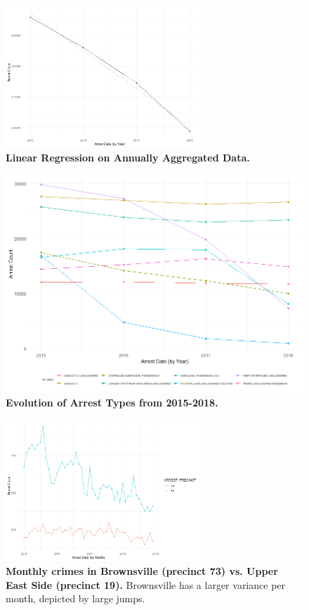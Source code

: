 \documentclass[11pt]{article}\usepackage[]{graphicx}\usepackage[]{color}
\begin{document}
\begin{figure}[H]
  \centering
    \includegraphics[width=0.65\textwidth]{Yearlytrend.png}
  \caption{\textbf{Linear Regression on Annually Aggregated Data.}}
  \label{fig:Yearlytrend}
\end{figure}

\begin{figure}[H]
  \centering
    \includegraphics[width=\textwidth]{crimeOverYears.png}
  \caption{\textbf{Evolution of Arrest Types from 2015-2018.}}
  \label{fig:crimeOverYears}
\end{figure}

\newpage

\begin{figure}[H]
  \centering
    \includegraphics[width=0.65\textwidth]{BrownUES.png}
  \caption{\textbf{Monthly crimes in Brownsville (precinct 73) vs. Upper East Side (precinct 19).} Brownsville has a larger variance per month, depicted by large jumps.}
  \label{fig:BrownUES}
\end{figure}
\end{document}
